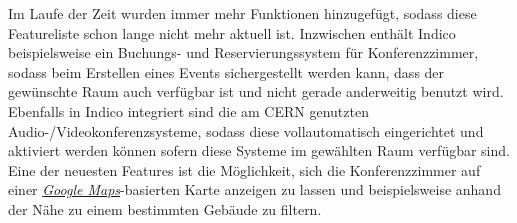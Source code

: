 Im Laufe der Zeit wurden immer mehr Funktionen hinzugefügt, sodass diese Featureliste schon lange
nicht mehr aktuell ist.  Inzwischen enthält Indico beispielsweise ein Buchungs- und
Reservierungssystem für Konferenzzimmer, sodass beim Erstellen eines Events sichergestellt werden
kann, dass der gewünschte Raum auch verfügbar ist und nicht gerade anderweitig benutzt wird.
Ebenfalls in Indico integriert sind die am CERN genutzten Audio-/Videokonferenzsysteme, sodass diese
vollautomatisch eingerichtet und aktiviert werden können sofern diese Systeme im gewählten Raum
verfügbar sind. Eine der neuesten Features ist die Möglichkeit, sich die Konferenzzimmer auf einer
\href{http://maps.google.com/}{\emph{Google Maps}}-basierten Karte anzeigen zu lassen und
beispielsweise anhand der Nähe zu einem bestimmten Gebäude zu filtern.
